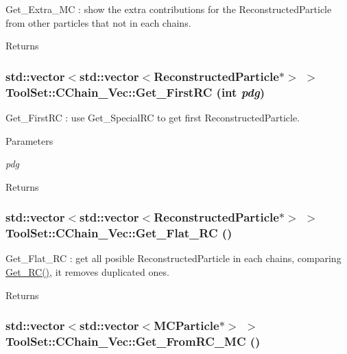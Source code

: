 Get\_\-Extra\_\-MC : show the extra contributions for the ReconstructedParticle from other particles that not in each chains. \begin{DoxyReturn}{Returns}

\end{DoxyReturn}
\hypertarget{classToolSet_1_1CChain__Vec_a905c1fd107c1b322d6ef151f663e572b}{
\subsubsection[{Get\_\-FirstRC}]{\setlength{\rightskip}{0pt plus 5cm}std::vector$<$std::vector$<$ReconstructedParticle$\ast$$>$ $>$ ToolSet::CChain\_\-Vec::Get\_\-FirstRC (int {\em pdg})}}
\label{classToolSet_1_1CChain__Vec_a905c1fd107c1b322d6ef151f663e572b}


Get\_\-FirstRC : use Get\_\-SpecialRC to get first ReconstructedParticle. 
\begin{DoxyParams}{Parameters}
\item[{\em pdg}]\end{DoxyParams}
\begin{DoxyReturn}{Returns}

\end{DoxyReturn}
\hypertarget{classToolSet_1_1CChain__Vec_af8c4b4a166397de13996edf3aa3190e7}{
\subsubsection[{Get\_\-Flat\_\-RC}]{\setlength{\rightskip}{0pt plus 5cm}std::vector$<$std::vector$<$ReconstructedParticle$\ast$$>$ $>$ ToolSet::CChain\_\-Vec::Get\_\-Flat\_\-RC ()}}
\label{classToolSet_1_1CChain__Vec_af8c4b4a166397de13996edf3aa3190e7}


Get\_\-Flat\_\-RC : get all posible ReconstructedParticle in each chains, comparing \hyperlink{classToolSet_1_1CChain__Vec_a790838ea04f22624ad047e8e3f351db5}{Get\_\-RC()}, it removes duplicated ones. \begin{DoxyReturn}{Returns}

\end{DoxyReturn}
\hypertarget{classToolSet_1_1CChain__Vec_ab8d0093a6613c407e546d988ef5d8e0a}{
\subsubsection[{Get\_\-FromRC\_\-MC}]{\setlength{\rightskip}{0pt plus 5cm}std::vector$<$std::vector$<$MCParticle$\ast$$>$ $>$ ToolSet::CChain\_\-Vec::Get\_\-FromRC\_\-MC ()}}
\label{classToolSet_1_1CChain__Vec_ab8d0093a6613c407e546d988ef5d8e0a}


